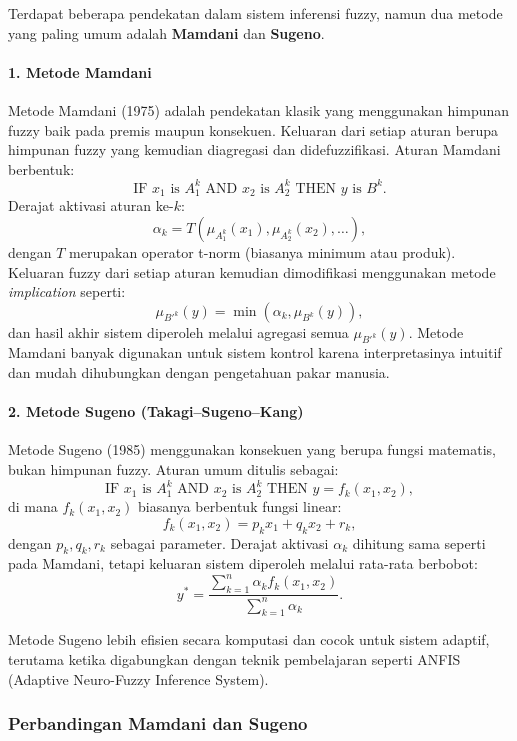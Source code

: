 \documentclass[12pt,a4paper]{article}
\theoremstyle{remark}
\begin{document}
Terdapat beberapa pendekatan dalam sistem inferensi fuzzy, namun dua metode yang paling umum adalah \textbf{Mamdani} dan \textbf{Sugeno}.

\paragraph{1. Metode Mamdani}
Metode Mamdani (1975) adalah pendekatan klasik yang menggunakan himpunan fuzzy baik pada premis maupun konsekuen. Keluaran dari setiap aturan berupa himpunan fuzzy yang kemudian diagregasi dan didefuzzifikasi.
Aturan Mamdani berbentuk:
\[
    \text{IF } x_1 \text{ is } A_1^k \text{ AND } x_2 \text{ is } A_2^k \text{ THEN } y \text{ is } B^k.
\]
Derajat aktivasi aturan ke-\(k\):
\[
    \alpha_k = T(\mu_{A_1^k}(x_1), \mu_{A_2^k}(x_2), \dots),
\]
dengan \(T\) merupakan operator t-norm (biasanya minimum atau produk).
Keluaran fuzzy dari setiap aturan kemudian dimodifikasi menggunakan metode \textit{implication} seperti:
\[
    \mu_{B'^k}(y) = \min(\alpha_k, \mu_{B^k}(y)),
\]
dan hasil akhir sistem diperoleh melalui agregasi semua \(\mu_{B'^k}(y)\).
Metode Mamdani banyak digunakan untuk sistem kontrol karena interpretasinya intuitif dan mudah dihubungkan dengan pengetahuan pakar manusia.

\paragraph{2. Metode Sugeno (Takagi–Sugeno–Kang)}
Metode Sugeno (1985) menggunakan konsekuen yang berupa fungsi matematis, bukan himpunan fuzzy. Aturan umum ditulis sebagai:
\[
    \text{IF } x_1 \text{ is } A_1^k \text{ AND } x_2 \text{ is } A_2^k \text{ THEN } y = f_k(x_1, x_2),
\]
di mana \(f_k(x_1, x_2)\) biasanya berbentuk fungsi linear:
\[
    f_k(x_1, x_2) = p_k x_1 + q_k x_2 + r_k,
\]
dengan \(p_k, q_k, r_k\) sebagai parameter.
Derajat aktivasi \(\alpha_k\) dihitung sama seperti pada Mamdani, tetapi keluaran sistem diperoleh melalui rata-rata berbobot:
\begin{equation}
    y^* = \frac{\sum_{k=1}^n \alpha_k f_k(x_1, x_2)}{\sum_{k=1}^n \alpha_k}.
    \label{eq:defuzzifikasi_sugeno}
\end{equation}


Metode Sugeno lebih efisien secara komputasi dan cocok untuk sistem adaptif, terutama ketika digabungkan dengan teknik pembelajaran seperti ANFIS (Adaptive Neuro-Fuzzy Inference System).

\subsubsection{Perbandingan Mamdani dan Sugeno}
\end{document}
